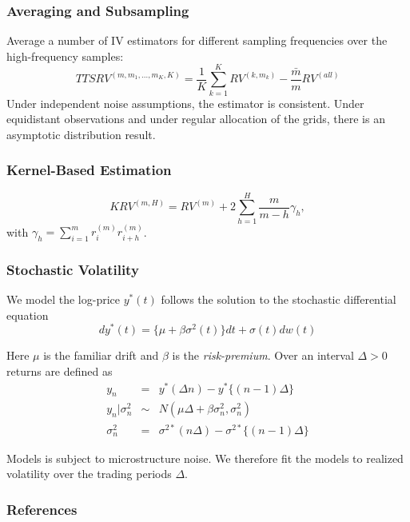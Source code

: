 \documentclass{beamer}
\begin{document}
\begin{frame}
	\frametitle{Averaging and Subsampling}
	Average a number of IV estimators for different sampling frequencies over the high-frequency samples:
	\begin{equation}
		TTSRV^{(m,m_1, \ldots, m_K, K)} = \frac{1}{K}\sum_{k=1}^K RV^{(k,m_k)} - \frac{\bar{m}}{m}RV^{(all)}
	\end{equation}
	Under independent noise assumptions, the estimator is consistent. Under equidistant observations and under regular allocation of the grids, there is an asymptotic distribution result. 
\end{frame}
	
\begin{frame}
	\frametitle{Kernel-Based Estimation}
	\begin{equation}
		KRV^{(m,H)} = RV^{(m)} + 2\sum_{h=1}^H \frac{m}{m-h}\gamma_h,
	\end{equation}
	with $\gamma_h = \sum_{i=1}^m r_i^{(m)} r_{i+h}^{(m)}$. 
\end{frame}

\begin{frame}
	\frametitle{Stochastic Volatility}
	We model the log-price $y^{*}(t)$ follows the solution to the stochastic differential equation
	\begin{equation}
		dy^{*}(t) = \{ \mu  + \beta\sigma^2(t) \}dt + \sigma(t)dw(t) 
	\end{equation}

	Here $\mu$ is the familiar drift and $\beta$ is the \textit{risk-premium}. Over an interval $\Delta > 0$ returns are defined as 
	\begin{eqnarray*}
		y_n &=& y^{*}(\Delta n) - y^{*}\{ (n-1)\Delta \} \\
		y_n | \sigma^2_n &\sim& N(\mu\Delta + \beta\sigma_n^2, \sigma^2_n ) \\
		\sigma_n^2 &=& \sigma^{2*} (n\Delta) - \sigma^{2*} \{ (n-1)\Delta \}
	\end{eqnarray*}

	\pause
	
	Models is subject to microstructure noise. We therefore fit the models to realized volatility over the trading periods $\Delta$. 
\end{frame}

\begin{frame}[allowframebreaks]
        \frametitle{References}
        
        
\end{frame}
\end{document}
